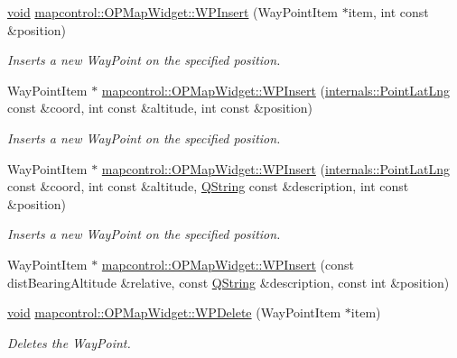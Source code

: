 \begin{DoxyCompactItemize}
\hyperlink{group___u_a_v_objects_plugin_ga444cf2ff3f0ecbe028adce838d373f5c}{void} \hyperlink{group___o_p_map_widget_ga65a6a571d08fec807a20945e293acc73}{mapcontrol\-::\-O\-P\-Map\-Widget\-::\-W\-P\-Insert} (\-Way\-Point\-Item $\ast$item, int const \&position)
\begin{DoxyCompactList}\small\item\em \-Inserts a new \-Way\-Point on the specified position. \end{DoxyCompactList}\item 
\-Way\-Point\-Item $\ast$ \hyperlink{group___o_p_map_widget_ga1b5b37540dd272a7b6f4a39ae12095a4}{mapcontrol\-::\-O\-P\-Map\-Widget\-::\-W\-P\-Insert} (\hyperlink{structinternals_1_1_point_lat_lng}{internals\-::\-Point\-Lat\-Lng} const \&coord, int const \&altitude, int const \&position)
\begin{DoxyCompactList}\small\item\em \-Inserts a new \-Way\-Point on the specified position. \end{DoxyCompactList}\item 
\-Way\-Point\-Item $\ast$ \hyperlink{group___o_p_map_widget_ga344e39ad3db8c1de32dda8273e78310e}{mapcontrol\-::\-O\-P\-Map\-Widget\-::\-W\-P\-Insert} (\hyperlink{structinternals_1_1_point_lat_lng}{internals\-::\-Point\-Lat\-Lng} const \&coord, int const \&altitude, \hyperlink{group___u_a_v_objects_plugin_gab9d252f49c333c94a72f97ce3105a32d}{\-Q\-String} const \&description, int const \&position)
\begin{DoxyCompactList}\small\item\em \-Inserts a new \-Way\-Point on the specified position. \end{DoxyCompactList}\item 
\-Way\-Point\-Item $\ast$ \hyperlink{group___o_p_map_widget_gaf16670bc38e8aca978582a35732e2e6b}{mapcontrol\-::\-O\-P\-Map\-Widget\-::\-W\-P\-Insert} (const dist\-Bearing\-Altitude \&relative, const \hyperlink{group___u_a_v_objects_plugin_gab9d252f49c333c94a72f97ce3105a32d}{\-Q\-String} \&description, const int \&position)
\item 
\hyperlink{group___u_a_v_objects_plugin_ga444cf2ff3f0ecbe028adce838d373f5c}{void} \hyperlink{group___o_p_map_widget_gacb242b413e111fc504749bdfacc16fd2}{mapcontrol\-::\-O\-P\-Map\-Widget\-::\-W\-P\-Delete} (\-Way\-Point\-Item $\ast$item)
\begin{DoxyCompactList}\small\item\em \-Deletes the \-Way\-Point. \end{DoxyCompactList}\item 

\end{DoxyCompactItemize}

